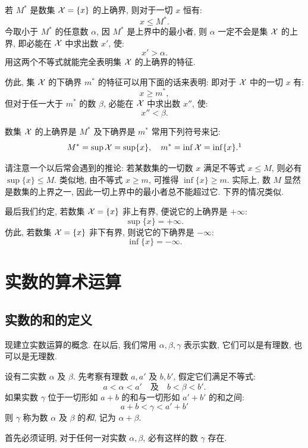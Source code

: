 若 $M^*$ 是数集 $\mathcal{X} = \{x\}$ 的上确界, 则对于一切 $x$ 恒有:
$$ x \leq M^*. $$
今取小于 $M^*$ 的任意数 $\alpha$,
因 $M^*$ 是上界中的最小者, 则 $\alpha$ 一定不会是集 $\mathcal{X}$ 的上界,
即必能在 $\mathcal{X}$ 中求出数 $x'$, 使:
$$ x' > \alpha. $$
用这两个不等式就能完全表明集 $\mathcal{X}$ 的上确界的特征.

仿此, 集 $\mathcal{X}$ 的下确界 $m^*$ 的特征可以用下面的话来表明: 即对于 $\mathcal{X}$ 中的一切 $x$ 有:
$$ x \geq m^*, $$
但对于任一大于 $m^*$ 的数 $\beta$, 必能在 $\mathcal{X}$ 中求出数 $x''$, 使:
$$ x'' < \beta. $$

数集 $\mathcal{X}$ 的上确界是 $M^*$ 及下确界是 $m^*$ 常用下列符号来记:
$$ M^* = \sup \X = \sup \{x\}, \quad m^* = \inf \X = \inf \{x\}. \footnotemark$$

请注意一个以后常会遇到的推论:
{\kaishu 若某数集的一切数 $x$ 满足不等式 $x \leq M$, 则必有 $\sup\{x\} \leq M$.}
类似地, {\kaishu 由不等式 $x \geq m$, 可推得 $\inf\{x\} \geq m$}.
实际上, 数 $M$ 显然是数集的上界之一, 因此一切上界中的最小者总不能超过它.
下界的情况类似.

最后我们约定, 若数集 $\mathcal{X} = \{x\}$ 非上有界, 便说它的上确界是 $+\infty$:
$$ \sup\{x\} = +\infty. $$
仿此, 若数集 $\mathcal{X} = \{x\}$ 非下有界, 则说它的下确界是 $-\infty$:
$$ \inf\{x\} = -\infty. $$

\section{实数的算术运算}

\subsection{实数的和的定义} \label{subsec:12}

现建立实数运算的概念.
在以后, 我们常用 $\alpha, \beta, \gamma$ 表示实数, 它们可以是有理数, 也可以是无理数.

设有二实数 $\alpha$ 及 $\beta$.
先考察有理数 $a, a'$ 及 $b, b'$, 假定它们满足不等式:
\begin{equation}\label{eq:sum_ineq1}
a < \alpha < a' \quad \text{及} \quad b < \beta < b'.
\end{equation}
{\kaishu
如果实数 $\gamma$ 位于一切形如 $a+b$ 的和与一切形如 $a'+b'$ 的和之间:
\begin{equation}\label{eq:sum_ineq2}
a+b < \gamma < a'+b'
\end{equation}
则 $\gamma$ 称为数 $\alpha$ 及 $\beta$ 的\emph{和}, 记为 $\alpha + \beta$.
}

首先必须证明, 对于任何一对实数 $\alpha, \beta$, 必有这样的数 $\gamma$ 存在.

